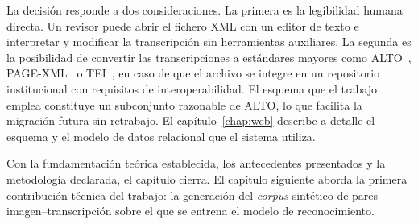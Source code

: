 La decisión responde a dos consideraciones. La primera es la legibilidad humana directa. Un revisor puede abrir el fichero XML con un editor de texto e interpretar y modificar la transcripción sin herramientas auxiliares. La segunda es la posibilidad de convertir las transcripciones a estándares mayores como ALTO~\cite{loc-alto}, PAGE-XML~\cite{pletschacher2010page} o TEI~\cite{tei-consortium}, en caso de que el archivo se integre en un repositorio institucional con requisitos de interoperabilidad. El esquema que el trabajo emplea constituye un subconjunto razonable de ALTO, lo que facilita la migración futura sin retrabajo. El capítulo~\ref{chap:web} describe a detalle el esquema y el modelo de datos relacional que el sistema utiliza.


Con la fundamentación teórica establecida, los antecedentes presentados y la metodología declarada, el capítulo cierra. El capítulo siguiente aborda la primera contribución técnica del trabajo: la generación del \textit{corpus} sintético de pares imagen--transcripción sobre el que se entrena el modelo de reconocimiento.
